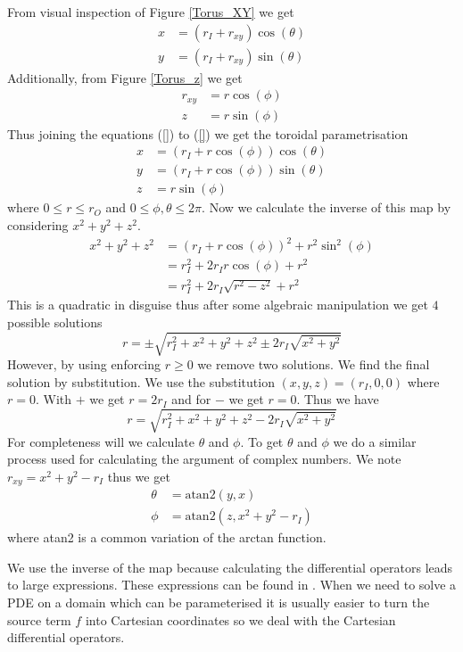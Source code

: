 \documentclass[12pt,a4paper]{article}
\begin{document}
From visual inspection of Figure \ref{Torus_XY} we get 
\begin{align}
x &= (r_I + r_{xy})\cos(\theta)\\
y &= (r_I + r_{xy})\sin(\theta)
\end{align}
Additionally, from Figure \ref{Torus_z} we get 
\begin{align}
r_{xy}& = r \cos(\phi) \\
z &= r \sin(\phi)
\end{align}
Thus joining the equations (\ref{}) to (\ref{}) we get the toroidal parametrisation
\begin{align}
x &= (r_I + r\cos(\phi))\cos(\theta) \\
y &= (r_I + r \cos(\phi))\sin(\theta) \\
z &= r \sin(\phi)
\end{align}
where $0\leq r \leq r_O$ and $0 \leq \phi, \theta \leq 2 \pi$. Now we calculate the inverse of this map by considering $x^2 + y^2 + z^2$. 
\begin{align}
x^2 + y^2 + z^2 &= (r_I + r \cos(\phi))^2 + r^2\sin^2(\phi)\\
&= r_I^2 + 2r_Ir\cos(\phi) + r^2\\
&= r_I^2 +2r_I \sqrt{r^2-z^2} + r^2
\end{align}
This is a quadratic in disguise thus after some algebraic manipulation we get $4$ possible solutions
\begin{equation}
r = \pm\sqrt{r_I^2 + x^2 + y^2 + z^2 \pm 2r_I\sqrt{x^2+y^2}}
\end{equation}
However, by using enforcing $r\geq0$ we remove two solutions. We find the final solution by substitution. We use the substitution $(x, y, z) = (r_I, 0, 0)$ where $r=0$. With $+$ we get $r=2r_I$ and for $-$ we get $r = 0$. Thus we have 
\begin{equation}
r = \sqrt{r_I^2 + x^2 + y^2 + z^2 - 2r_I\sqrt{x^2+y^2}}
\end{equation}
For completeness will we calculate $\theta$ and $\phi$. To get $\theta$ and $\phi$ we do a similar process used for calculating the argument of complex numbers. We note $r_{xy}=x^2+y^2-r_I$ thus we get
\begin{align}
\theta &= \text{atan2}(y, x) \\
\phi &= \text{atan2}(z, x^2+y^2-r_{I})
\end{align}
where atan2 is a common variation of the arctan function.

We use the inverse of the map because calculating the differential operators leads to large expressions. These expressions can be found in \cite{}. When we need to solve a PDE on a domain which can be parameterised it is usually easier to turn the source term $f$ into Cartesian coordinates so we deal with the Cartesian differential operators.
\end{document}
